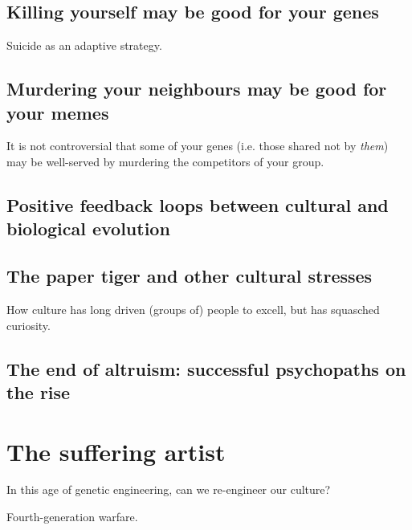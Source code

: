 \documentclass{article}
\begin{document}
\subsection{Killing yourself may be good for your genes}

Suicide as an adaptive strategy.

\subsection{Murdering your neighbours may be good for your memes}

It is not controversial that some of your genes (i.e. those shared not by \emph{them}) may be well-served by murdering the competitors of your group.

\subsection{Positive feedback loops between cultural and biological evolution}

\subsection{The paper tiger and other cultural stresses}

How culture has long driven (groups of) people to excell, but has squasched curiosity.

\subsection{The end of altruism: successful psychopaths on the rise}

\section{The suffering artist}

In this age of genetic engineering, can we re-engineer our culture?

Fourth-generation warfare.




\end{document}
